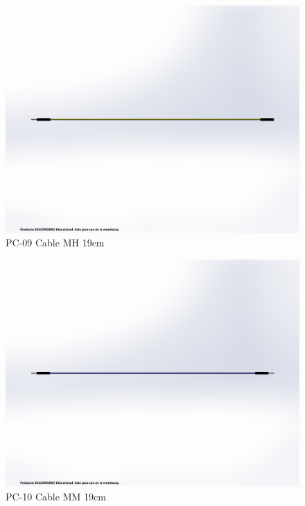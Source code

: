     \begin{figure}[H]
        \centering
        \includegraphics[trim = {1mm 50mm 1mm 50mm},clip,scale=0.2]{3/Img/cableMHFigura.pdf}
        \caption{PC-09 Cable MH 19cm}
        \label{fig:cableMHFigura}
    \end{figure}
    \begin{figure}[H]
        \centering
        \includegraphics[trim = {1mm 50mm 1mm 50mm},clip,scale=0.2]{3/Img/cableMMFigura.pdf}
        \caption{PC-10 Cable MM 19cm}
        \label{fig:cableMMFigura}
    \end{figure}
